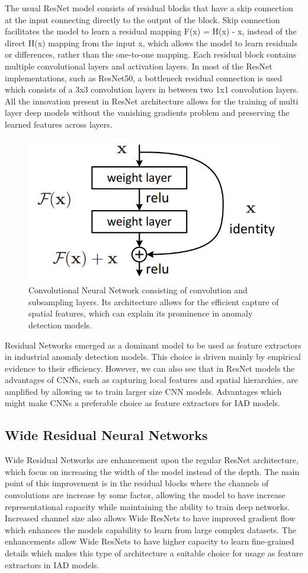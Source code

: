 The usual ResNet model consists of residual blocks that have a skip connection at the input connecting directly to the output of the block. Skip connection facilitates the model to learn a residual mapping F(x) = H(x) - x, instead of the direct H(x) mapping from the input x, which allows the model to learn residuals or differences, rather than the one-to-one mapping. Each residual block contains multiple convolutional layers and activation layers. In most of the ResNet implementations, such as ResNet50, a bottleneck residual connection is used which consists of a 3x3 convolution layers in between two 1x1 convolution layers. All the innovation present in ResNet architecture allows for the training of multi layer deep models without the vanishing gradients problem and preserving the learned features across layers.

\begin{figure}[h]
	\begin{center}
		\includegraphics[width=0.5\linewidth]{Chapter_2/resnet.png}
	\end{center}
	\caption{Convolutional Neural Network consisting of convolution and subsampling layers. Its architecture allows for the efficient capture of spatial features, which can explain its prominence in anomaly detection models.}
	\label{fig:cnn}
\end{figure}

Residual Networks emerged as a dominant model to be used as feature extractors in industrial anomaly detection models. This choice is driven mainly by empirical evidence to their efficiency. However, we can also see that in ResNet models the advantages of CNNs, such as capturing local features and spatial hierarchies, are amplified by allowing us to train larger size CNN models. Advantages which might make CNNs a preferable choice as feature extractors for IAD models.

\subsection{Wide Residual Neural Networks}
\label{wideresnet}
Wide Residual Networks are enhancement upon the regular ResNet architecture, which focus on increasing the width of the model instead of the depth. The main point of this improvement is in the residual blocks where the channels of convolutions are increase by some factor, allowing the model to have increase representational capacity while maintaining the ability to train deep networks. Increased channel size also allows Wide ResNets to have improved gradient flow which enhances the models capability to learn from large complex datasets. The enhancements allow Wide ResNets to have higher capacity to learn fine-grained details which makes this type of architecture a suitable choice for usage as feature extractors in IAD models.

